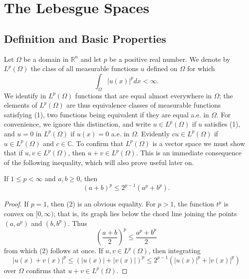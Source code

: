 \chapter[The Lebesgue Spaces $L^p(\Omega)$]%
  {The Lebesgue Spaces }


\section{Definition and Basic Properties}

\begin{para}
  Let $\Omega$ be a domain in $\mathbb{R}^n$ and let $p$ be a positive
  real number. We denote by $L^p(\Omega)$ the class of all measurable
  functions $u$ defined on $\Omega$ for which
  \begin{equation}\label{eq:2.1}
    \int_{\Omega} |u(x)|^p dx < \infty.
  \end{equation}
  We identify in $L^p(\Omega)$ functions that are equal almost everywhere in $\Omega$; the elements of $L^p(\Omega)$ are thus equivalence classes of measurable functions satisfying (1), two functions being equivalent if they are equal a.e. in $\Omega$. For convenience, we ignore this distinction, and write $u \in L^p(\Omega)$ if $u$ satisfies (1), and $u=0$ in $L^p(\Omega)$ if $u(x)=0$ a.e. in $\Omega$. Evidently $c u \in L^p(\Omega)$ if $u \in L^p(\Omega)$ and $c \in \mathbb{C}$. To confirm that $L^p(\Omega)$ is a vector space we must show that if $u, v \in L^p(\Omega)$, then $u+v \in L^p(\Omega)$. This is an immediate consequence of the following inequality, which will also prove useful later on.
\end{para}


\begin{lemma}
  If $1 \leq p<\infty$ and $a, b \geq 0$, then
  \begin{equation}\label{eq:2.2}
    (a+b)^p \leq 2^{p-1}\left(a^p+b^p\right) .
  \end{equation}
\end{lemma}

\begin{proof}
  If $p=1$, then (2) is an obvious equality. For $p>1$, the function $t^p$ is convex on $[0, \infty)$; that is, its graph lies below the chord line joining the points
  $\left(a, a^p\right)$ and $\left(b, b^p\right)$. Thus
  \[
  \left(\frac{a+b}{2}\right)^p \leq \frac{a^p+b^p}{2}
  \]
  from which (2) follows at once.
  If $u, v \in L^p(\Omega)$, then integrating
  \[
  |u(x)+v(x)|^p \leq(|u(x)|+|v(x)|)^p \leq 2^{p-1}\left(|u(x)|^p+|v(x)|^p\right)
  \]
  over $\Omega$ confirms that $u+v \in L^p(\Omega)$.
\end{proof}

